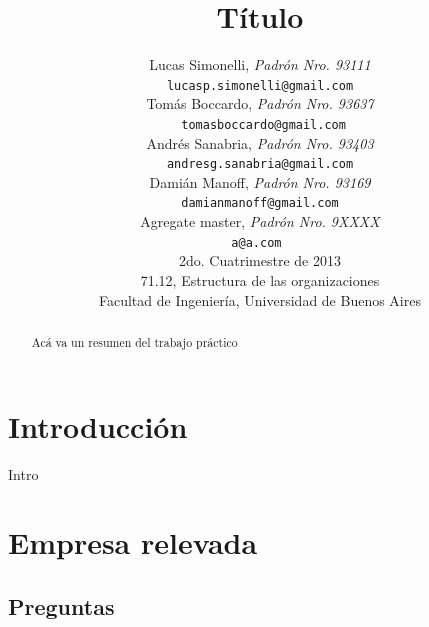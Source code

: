 \documentclass[a4paper,10pt]{article}
\title{		\textbf{Título}}
\author{	Lucas Simonelli, \textit{Padrón Nro. 93111}                     \\
            \texttt{ lucasp.simonelli@gmail.com }                                              \\[2.5ex]
            Tomás Boccardo, \textit{Padrón Nro. 93637}                     \\
            \texttt{ tomasboccardo@gmail.com}                                              \\[2.5ex]
            Andrés Sanabria, \textit{Padrón Nro. 93403}                     \\
            \texttt{ andresg.sanabria@gmail.com  }                                              \\[2.5ex]
            Dami\'an Manoff, \textit{Padrón Nro. 93169}                     \\
            \texttt{ damianmanoff@gmail.com  }                                              \\[2.5ex]
             Agregate master, \textit{Padrón Nro. 9XXXX}                     \\
            \texttt{a@a.com  }                                              \\[2.5ex]
            \normalsize{2do. Cuatrimestre de 2013}                                      \\
            \normalsize{71.12, Estructura de las organizaciones}  \\
            \normalsize{Facultad de Ingeniería, Universidad de Buenos Aires}            \\
       }
\date{}
\begin{document}
\maketitle
\thispagestyle{empty}   %



\begin{abstract}
Acá va un resumen del trabajo práctico
\end{abstract}

\newpage
\tableofcontents
\newpage
\section{Introducción}
Intro
\section{Empresa relevada}
	\subsection{Preguntas}
\end{document}
